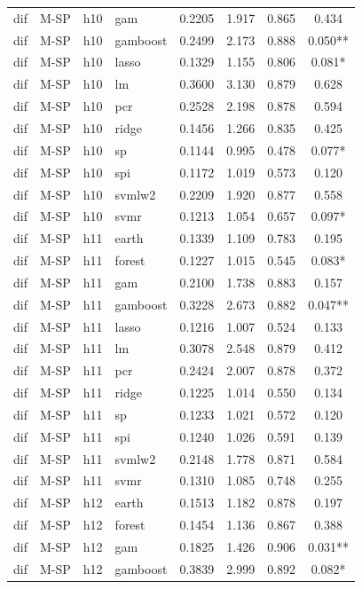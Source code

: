 \begin{ThreePartTable}
\begin{longtable}[t]{llclcccc}
dif & M-SP & h10 & gam & 0.2205 & 1.917 & 0.865 & 0.434\\
dif & M-SP & h10 & gamboost & 0.2499 & 2.173 & 0.888 & 0.050**\\
dif & M-SP & h10 & lasso & 0.1329 & 1.155 & 0.806 & 0.081*\\
dif & M-SP & h10 & lm & 0.3600 & 3.130 & 0.879 & 0.628\\
dif & M-SP & h10 & pcr & 0.2528 & 2.198 & 0.878 & 0.594\\
dif & M-SP & h10 & ridge & 0.1456 & 1.266 & 0.835 & 0.425\\
dif & M-SP & h10 & sp & 0.1144 & 0.995 & 0.478 & 0.077*\\
dif & M-SP & h10 & spi & 0.1172 & 1.019 & 0.573 & 0.120\\
dif & M-SP & h10 & svmlw2 & 0.2209 & 1.920 & 0.877 & 0.558\\
dif & M-SP & h10 & svmr & 0.1213 & 1.054 & 0.657 & 0.097*\\
\addlinespace
dif & M-SP & h11 & earth & 0.1339 & 1.109 & 0.783 & 0.195\\
dif & M-SP & h11 & forest & 0.1227 & 1.015 & 0.545 & 0.083*\\
dif & M-SP & h11 & gam & 0.2100 & 1.738 & 0.883 & 0.157\\
dif & M-SP & h11 & gamboost & 0.3228 & 2.673 & 0.882 & 0.047**\\
dif & M-SP & h11 & lasso & 0.1216 & 1.007 & 0.524 & 0.133\\
dif & M-SP & h11 & lm & 0.3078 & 2.548 & 0.879 & 0.412\\
dif & M-SP & h11 & pcr & 0.2424 & 2.007 & 0.878 & 0.372\\
dif & M-SP & h11 & ridge & 0.1225 & 1.014 & 0.550 & 0.134\\
dif & M-SP & h11 & sp & 0.1233 & 1.021 & 0.572 & 0.120\\
dif & M-SP & h11 & spi & 0.1240 & 1.026 & 0.591 & 0.139\\
dif & M-SP & h11 & svmlw2 & 0.2148 & 1.778 & 0.871 & 0.584\\
dif & M-SP & h11 & svmr & 0.1310 & 1.085 & 0.748 & 0.255\\
\addlinespace
dif & M-SP & h12 & earth & 0.1513 & 1.182 & 0.878 & 0.197\\
dif & M-SP & h12 & forest & 0.1454 & 1.136 & 0.867 & 0.388\\
dif & M-SP & h12 & gam & 0.1825 & 1.426 & 0.906 & 0.031**\\
dif & M-SP & h12 & gamboost & 0.3839 & 2.999 & 0.892 & 0.082*\\

\end{longtable}
\end{ThreePartTable}
